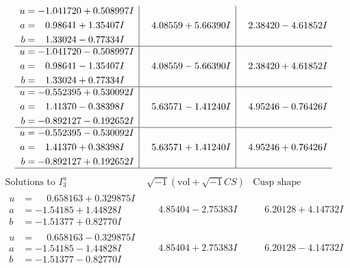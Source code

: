 \documentclass[1p]{elsarticle_modified}
\theoremstyle{definition}
\newcommand{\I}{\sqrt{-1}}
\begin{document}
$$\begin{array}{c|c|c}
\begin{aligned}
u &= -1.041720 + 0.508997 I \\
a &= \phantom{-}0.98641 + 1.35407 I \\
b &= \phantom{-}1.33024 - 0.77334 I\end{aligned}
 & \phantom{-}4.08559 + 5.66390 I & \phantom{-}2.38420 - 4.61852 I \\ \hline\begin{aligned}
u &= -1.041720 - 0.508997 I \\
a &= \phantom{-}0.98641 - 1.35407 I \\
b &= \phantom{-}1.33024 + 0.77334 I\end{aligned}
 & \phantom{-}4.08559 - 5.66390 I & \phantom{-}2.38420 + 4.61852 I \\ \hline\begin{aligned}
u &= -0.552395 + 0.530092 I \\
a &= \phantom{-}1.41370 - 0.38398 I \\
b &= -0.892127 - 0.192652 I\end{aligned}
 & \phantom{-}5.63571 - 1.41240 I & \phantom{-}4.95246 - 0.76426 I \\ \hline\begin{aligned}
u &= -0.552395 - 0.530092 I \\
a &= \phantom{-}1.41370 + 0.38398 I \\
b &= -0.892127 + 0.192652 I\end{aligned}
 & \phantom{-}5.63571 + 1.41240 I & \phantom{-}4.95246 + 0.76426 I\\
 \hline 
 \end{array}$$\newpage$$\begin{array}{c|c|c}  
\text{Solutions to }I^u_{3}& \I (\text{vol} + \sqrt{-1}CS) & \text{Cusp shape}\\
 \hline 
\begin{aligned}
u &= \phantom{-}0.658163 + 0.329875 I \\
a &= -1.54185 + 1.44828 I \\
b &= -1.51377 + 0.82770 I\end{aligned}
 & \phantom{-}4.85404 - 2.75383 I & \phantom{-}6.20128 + 4.14732 I \\ \hline\begin{aligned}
u &= \phantom{-}0.658163 - 0.329875 I \\
a &= -1.54185 - 1.44828 I \\
b &= -1.51377 - 0.82770 I\end{aligned}
 & \phantom{-}4.85404 + 2.75383 I & \phantom{-}6.20128 - 4.14732 I \\ \hline\begin{aligned}

\end{aligned}
\end{array}$$
\end{document}
